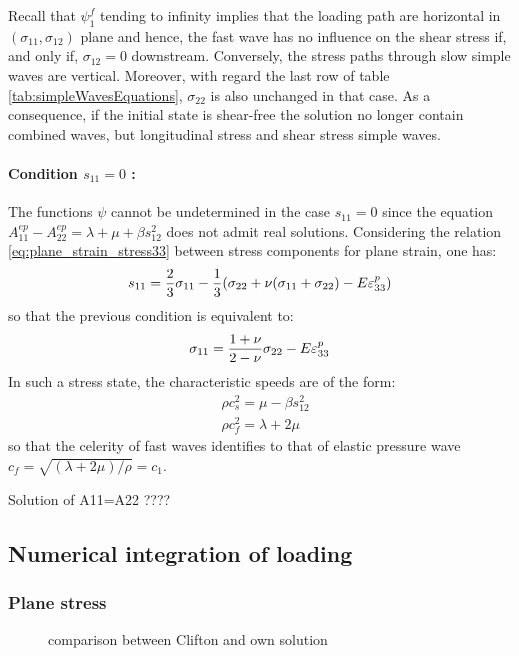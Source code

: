 Recall that $\psi^f_1$ tending to infinity implies that the loading path are horizontal in $(\sigma_{11},\sigma_{12})$ plane and hence, the fast wave has no influence on the shear stress if, and only if, $\sigma_{12}=0$ downstream. Conversely, the stress paths through slow simple waves are vertical. Moreover, with regard the last row of table \ref{tab:simpleWavesEquations}, $\sigma_{22}$ is also unchanged in that case. As a consequence, if the initial state is shear-free the solution no longer contain combined waves, but longitudinal stress and shear stress simple waves.

\paragraph*{Condition $s_{11}=0$ :} The functions $\psi$ cannot be undetermined in the case $s_{11}=0$ since the equation $A_{11}^{ep}-A_{22}^{ep}=\lambda + \mu + \beta s_{12}^2$ does not admit real solutions. Considering the relation \eqref{eq:plane_strain_stress33} between stress components for plane strain, one has:
\begin{equation*}
  s_{11}= \frac{2}{3}\sigma_{11}-\frac{1}{3}(\sigma_{22}+\nu(\sigma_{11}+\sigma_{22})-E\varepsilon^p_{33})
\end{equation*}
so that the previous condition is equivalent to:
\begin{equation}
  \label{eq:plane_strain_s11=0}
  \sigma_{11}=\frac{1+\nu}{2-\nu}\sigma_{22}-E\varepsilon^p_{33}
\end{equation}
In such a stress state, the characteristic speeds are of the form:
\begin{align*}
  & \rho c_s^2 = \mu -\beta s_{12}^2 \\
  & \rho c_f^2 = \lambda +2\mu 
\end{align*}
so that the celerity of fast waves identifies to that of elastic pressure wave $c_f=\sqrt{(\lambda + 2\mu)/\rho}=c_1$.

Solution of A11=A22 ????
\subsection{Numerical integration of loading}

\subsubsection*{Plane stress}
\begin{figure}[h!]
  \centering
   \qquad
  \caption{comparison between Clifton and own solution}
\end{figure}

